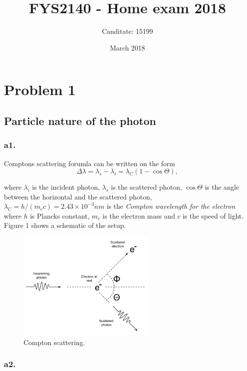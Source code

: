 \documentclass{article}
\title{FYS2140 - Home exam 2018}
\author{Canditate: 15199}
\date{March 2018}
\begin{document}
\maketitle

\section*{Problem 1}

\subsection*{Particle nature of the photon}

\subsubsection*{a1.}


Comptons scattering forumla can be written on the form
\begin{equation}
\Delta \lambda = \lambda_{s} - \lambda_{i} = \lambda_C(1 - \cos{\Theta}), \label{eq_compton}
\end{equation}

where $\lambda_{i}$ is the incident photon, $\lambda_{s}$ is the scattered photon, $\cos{\Theta}$ is the angle between the horizontal and the scattered photon, $\lambda_C = h/(m_ec) = 2.43\times 10^{-3}nm$ is the \textit{Compton wavelength for the electron} where $h$ is Plancks constant, $m_c$ is the electron mass and $c$ is the speed of light. Figure 1 shows a schematic of the setup.

\begin{figure}[t]
\centering
\includegraphics[width=0.6\textwidth]{comptonscattering}
\caption{Compton scattering.}
\label{fig:figure_label}
\end{figure}

\subsubsection*{a2.}
\end{document}
